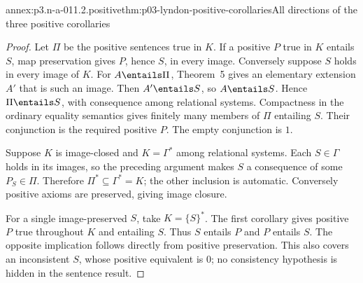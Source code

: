 \begin{annexitem}{annex:p3.n-a-011.2.positive}{thm:p03-lyndon-positive-corollaries}{All directions of the three positive corollaries}
\begin{proof}
Let \(\Pi\) be the positive sentences true in \(K\). If a positive
\(P\) true in \(K\) entails \(S\), map preservation gives \(P\),
hence \(S\), in every image. Conversely suppose \(S\) holds in
every image of \(K\). For \(A\entails\Pi\), Theorem~5 gives an
elementary extension \(A'\) that is such an image. Then
\(A'\entails S\), so \(A\entails S\). Hence
\(\Pi\entails S\), with consequence among relational systems.
Compactness in the ordinary equality semantics gives finitely many members of
\(\Pi\) entailing \(S\). Their conjunction is the required positive
\(P\). The empty conjunction is \(1\).

Suppose \(K\) is image-closed and \(K=\Gamma^*\) among relational
systems. Each \(S\in\Gamma\) holds in its images, so the preceding
argument makes \(S\) a consequence of some \(P_S\in\Pi\).
Therefore \(\Pi^*\subseteq\Gamma^*=K\); the other inclusion is
automatic. Conversely positive axioms are preserved, giving image closure.

For a single image-preserved \(S\), take \(K=\{S\}^*\). The first
corollary gives positive \(P\) true throughout \(K\) and entailing
\(S\). Thus \(S\) entails \(P\) and \(P\) entails \(S\).
The opposite implication follows directly from positive preservation.
This also covers an inconsistent \(S\), whose positive equivalent is
\(0\); no consistency hypothesis is hidden in the sentence result.
\end{proof}
\end{annexitem}

